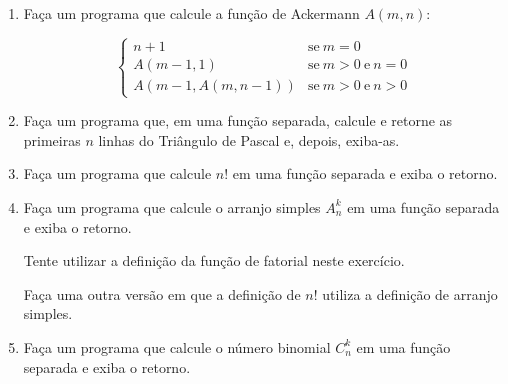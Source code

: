 \begin{enumerate}
\begin{multicols}{2}
		se $h=2$, 
		$a \times b$ 
		
		se $h=3$, 
		$a^b$ 
		
		se $h=4$,
		$a \uparrow \uparrow b$ 
		
		se $h=5$,
		$a \uparrow \uparrow \uparrow b$ 
		
		se $h=6$,
		$a \uparrow \uparrow \uparrow \uparrow b$ 
		
		\centering
		
		$\vdots$
		
		$a \underbrace{\uparrow \uparrow \uparrow \cdots \uparrow}_{h-2} b$
		
	\end{multicols}
	
\quebra 
	
	\item Faça um programa que calcule a função de Ackermann $A(m,n)$:
	
	\begin{equation*}		  
		\begin{cases}			
			n + 1 
				& \text{se} \ m = 0 \\
			A(m-1,1) 
				& \text{se} \ m > 0 
				\ \text{e} \ n = 0 \\
			A(m-1,A(m,n-1)) 
				& \text{se} \ m > 0  		
				\ \text{e} \ n > 0
		\end{cases}
	\end{equation*}

\quebra


	\item Faça um programa que, em uma função separada, calcule e retorne as primeiras $n$ linhas do Triângulo de Pascal e, depois, exiba-as.


	\item Faça um programa que calcule $n!$ em uma função separada e exiba o retorno.


	\item Faça um programa que calcule o arranjo simples $A^k_n$ em uma função separada e exiba o retorno.
	
	Tente utilizar a definição da função de fatorial neste exercício.
	
	Faça uma outra versão em que a definição de $n!$ utiliza a definição de arranjo simples.


	\item Faça um programa que calcule o número binomial $C^k_n$ em uma função separada e exiba o retorno.
	

\end{enumerate}
